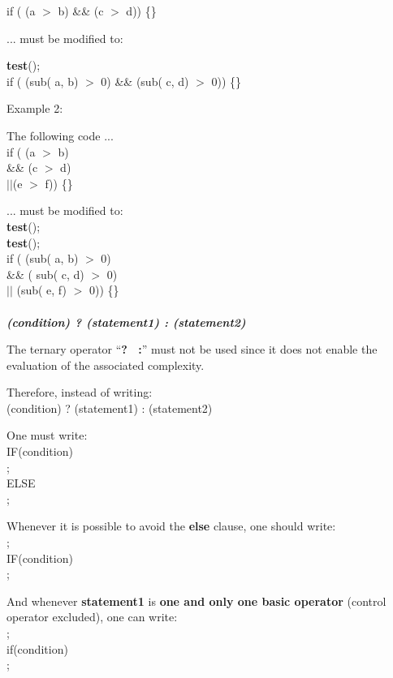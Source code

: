 if ( (a $>$ b) \&\& (c $>$ d)) \{\}

... must be modified to:

\textbf{test}(); \\
if ( (sub( a, b) $>$ 0) \&\& (sub( c, d) $>$ 0)) \{\}

Example 2:

The following code ...\\
if ( (a $>$ b) \\
\&\& (c $>$ d) \\
$||$(e $>$ f)) \{\}

... must be modified to:\\
\textbf{test}(); \\
\textbf{test}(); \\
if (  (sub( a, b) $>$ 0)\\
\&\& ( sub( c, d) $>$ 0)\\
$||$ (sub( e, f) $>$ 0)) \{\}\\

\ \\
\textbf{\emph{(condition) ? (statement1) : (statement2)}}

The ternary operator ``\textbf{? \ :}'' must not be used since it does
not enable the evaluation of the associated complexity.

Therefore, instead of writing: \\
(condition) ? (statement1) : (statement2)

One must write: \\
IF(condition)\\
;\\
ELSE\\
;

Whenever it is possible to avoid the \textbf{else} clause, one should write:\\
;\\
IF(condition)\\
;

And whenever \textbf{statement1} is \textbf{one and only one basic
operator} (control operator excluded), one can write:\\
;\\
if(condition)\\
;\\


